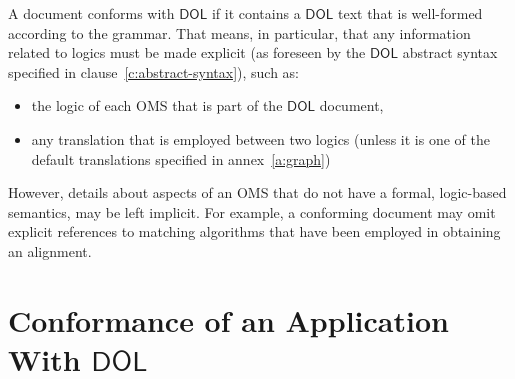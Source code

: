 \documentclass[10pt,fleqn,final]{scrreprt}
\newcommand*{\DOL}{\ensuremath{\mathsf{DOL}}\xspace}
\newcommand{\annexrefname}{annex}
\newcommand{\clauserefname}{clause}
\newcommand{\aref}[1]{\annexrefname~\ref{#1}}
\newcommand{\cref}[1]{\clauserefname~\ref{#1}}
\newcommand{\sclause}[1]{\section{#1}}
\begin{document}
A document conforms with \DOL if it contains a \DOL text that is well-formed according to the
grammar.  That means, in particular, that any information related to logics must be made explicit
(as foreseen by the \DOL abstract syntax specified in \cref{c:abstract-syntax}), such as:
\begin{itemize}
\item the logic of each OMS that is part of the \DOL document,
\item any translation that is employed between two logics (unless it is one of the default translations specified in \aref{a:graph})
\end{itemize}
However, details about aspects of an OMS that do not have a formal, logic-based semantics, may be
left implicit.  For example, a conforming document may omit explicit references to matching
algorithms that have been employed in obtaining an alignment.

\sclause{Conformance of an Application With \DOL}\label{c:conform:application}
\end{document}
